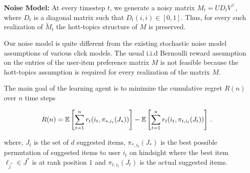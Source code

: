 \textbf{Noise Model:}  At every timestep $t$, we generate a noisy matrix ${M}_t = UD_t V^{\intercal}$, where $D_t$ is a diagonal matrix such that $D_t(i,i)\in[0,1]$. Thus, for every such realization of $\tilde{M}_t$  the hott-topics structure of $M$ is preserved. 


\begin{discussion}
Our noise model is quite different from the existing stochastic noise model assumptions of various click models. The usual i.i.d Bernoulli reward assumption on the entries of the user-item preference matrix $M$ is not feasible because the hott-topics assumption is required for every realization of the matrix $M$. 
\end{discussion}

  


The main goal of the learning agent is to minimize the cumulative regret $R(n)$  over $n$ time steps

\begin{align*}
  R(n) =
  \mathbb{E}\left[\sum_{t = 1}^n r_t(i_t, \pi_{\ast, i_t}(J_\ast))\right] - \mathbb{E}\left[\sum_{t = 1}^n r_t(i_t, \pi_{t, i_t}(J_t))\right]\,.
\end{align*}

where, $J_t$ is the set of $d$ suggested items, $\pi_{\ast, i_t}(J_\ast)$ is the best possible permutation of suggested items to user $i_t$ on hindsight where the best item $\ell_{j^*}\in J^*$ is at rank position $1$ and $\pi_{t, i_t}(J_t)$ is the actual suggested items.


